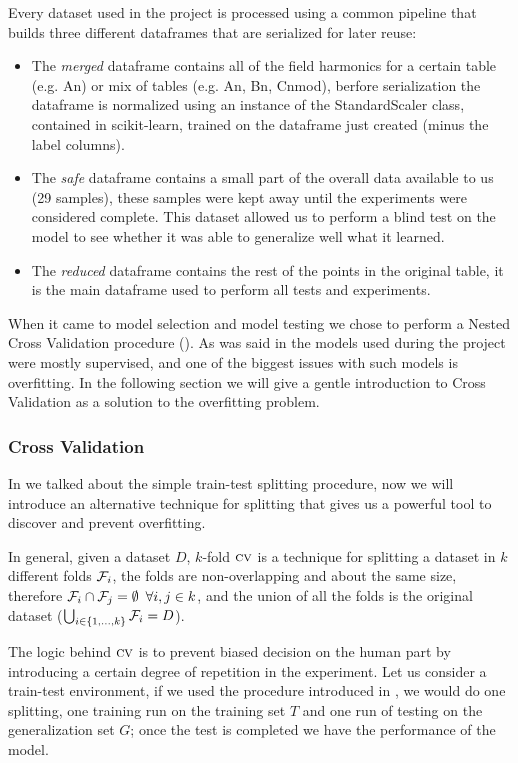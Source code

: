 Every dataset used in the project is processed using a common pipeline that builds three different
dataframes that are serialized for later reuse:
\begin{itemize}
	\item The \emph{merged} dataframe contains all of the field harmonics for a certain table
	      (e.g. An) or mix of tables (e.g. An, Bn, Cnmod), berfore serialization the dataframe is
	      normalized using an instance of the StandardScaler class, contained in scikit-learn, trained
	      on the dataframe just created (minus the label columns).
	\item The \emph{safe} dataframe contains a small part of the overall data available to us
	      (29 samples), these samples were kept away until the experiments were considered complete.
	      This dataset allowed us to perform a blind test on the model to see whether it was able to
	      generalize well what it learned.
	\item The \emph{reduced} dataframe contains the rest of the points in the original table,
	      it is the main dataframe used to perform all tests and experiments.
\end{itemize}

When it came to model selection and model testing we chose to perform a Nested Cross Validation
procedure (\ncv). As was said in  the models used during the project were mostly
supervised, and one of the biggest issues with such models is overfitting. In the following section
we will give a gentle introduction to Cross Validation as a solution to the overfitting problem.

\subsubsection{Cross Validation}
In  we talked about the simple train-test splitting procedure, now we will introduce an
alternative technique for splitting that gives us a powerful tool to discover and prevent
overfitting.

In general, given a dataset $D$, $k$-fold $\textsc{cv}$ \cite{ZhouZhi-Hua2021ML} is a technique for splitting a dataset in $k$
different folds $\mathcal{F}_{i}$, the folds are non-overlapping and about the same size, therefore
$\mathcal{F}_{i} \cap \mathcal{F}_{j} = \emptyset \hspace{5pt} \forall i, j \in k$, and the union of all the folds
is the original dataset ($\bigcup_{i \in \{1, \ldots, k\}} \mathcal{F}_{i} = D$).

The logic behind $\textsc{cv}$ is to prevent biased decision on the human part by introducing a certain
degree of repetition in the experiment. Let us consider a train-test environment, if we used the
procedure introduced in , we would do one splitting, one training run on the training
set $T$ and one run of testing on the generalization set $G$; once the test is completed we have the
performance of the model.

